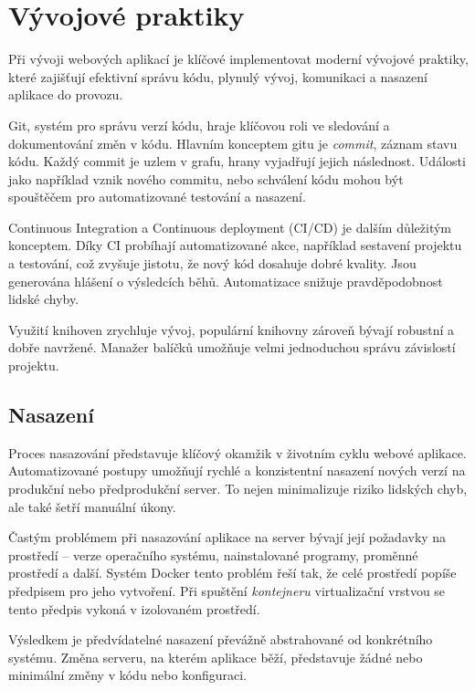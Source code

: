\section{Vývojové praktiky}

Při vývoji webových aplikací je klíčové implementovat moderní vývojové praktiky, které zajišťují efektivní správu kódu, plynulý vývoj, komunikaci a nasazení aplikace do provozu.

Git, systém pro správu verzí kódu, hraje klíčovou roli ve sledování a dokumentování změn v kódu.
Hlavním konceptem gitu je \emph{commit}, záznam stavu kódu.
Každý commit je uzlem v grafu, hrany vyjadřují jejich následnost.
Události jako například vznik nového commitu, nebo schválení kódu mohou být spouštěčem pro automatizované testování a nasazení.

Continuous Integration a Continuous deployment (CI/CD) je dalším důležitým konceptem.
Díky CI probíhají automatizované akce, například sestavení projektu a testování, což zvyšuje jistotu, že nový kód dosahuje dobré kvality.
Jsou generována hlášení o výsledcích běhů.
Automatizace snižuje pravděpodobnost lidské chyby.

Využití knihoven zrychluje vývoj, populární knihovny zároveň bývají robustní a dobře navržené.  
Manažer balíčků umožňuje velmi jednoduchou správu závislostí projektu.

\subsection{Nasazení}

Proces nasazování představuje klíčový okamžik v životním cyklu webové aplikace.
Automatizované postupy umožňují rychlé a konzistentní nasazení nových verzí na produkční nebo předprodukční server.
To nejen minimalizuje riziko lidských chyb, ale také šetří manuální úkony.

Častým problémem při nasazování aplikace na server bývají její požadavky na prostředí -- verze operačního systému, nainstalované programy, proměnné prostředí a další.
Systém Docker tento problém řeší tak, že celé prostředí popíše předpisem pro jeho vytvoření.
Při spuštění \emph{kontejneru} virtualizační vrstvou se tento předpis vykoná v izolovaném prostředí.

Výsledkem je předvídatelné nasazení převážně abstrahované od konkrétního systému.
Změna serveru, na kterém aplikace běží, představuje žádné nebo minimální změny v kódu nebo konfiguraci. 

